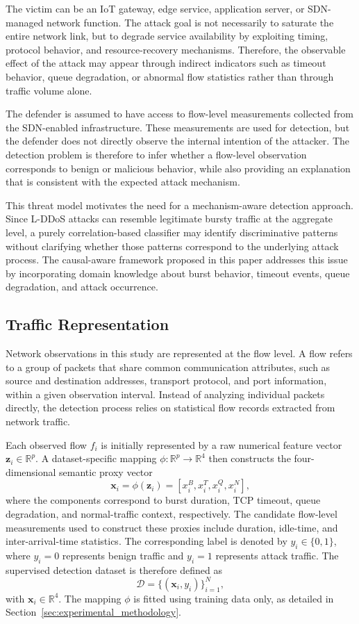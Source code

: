 \documentclass[journal]{IEEEtran}
\begin{document}
The victim can be an IoT gateway, edge service, application server, or SDN-managed network function. The attack goal is not necessarily to saturate the entire network link, but to degrade service availability by exploiting timing, protocol behavior, and resource-recovery mechanisms. Therefore, the observable effect of the attack may appear through indirect indicators such as timeout behavior, queue degradation, or abnormal flow statistics rather than through traffic volume alone.

The defender is assumed to have access to flow-level measurements collected from the SDN-enabled infrastructure. These measurements are used for detection, but the defender does not directly observe the internal intention of the attacker. The detection problem is therefore to infer whether a flow-level observation corresponds to benign or malicious behavior, while also providing an explanation that is consistent with the expected attack mechanism.

This threat model motivates the need for a mechanism-aware detection approach. Since L-DDoS attacks can resemble legitimate bursty traffic at the aggregate level, a purely correlation-based classifier may identify discriminative patterns without clarifying whether those patterns correspond to the underlying attack process. The causal-aware framework proposed in this paper addresses this issue by incorporating domain knowledge about burst behavior, timeout events, queue degradation, and attack occurrence.

\subsection{Traffic Representation}
\label{subsec:traffic_representation}

Network observations in this study are represented at the flow level. A flow refers to a group of packets that share common communication attributes, such as source and destination addresses, transport protocol, and port information, within a given observation interval. Instead of analyzing individual packets directly, the detection process relies on statistical flow records extracted from network traffic.

Each observed flow $f_i$ is initially represented by a raw numerical feature
vector $\mathbf{z}_i \in \mathbb{R}^{p}$. A dataset-specific mapping
$\phi: \mathbb{R}^{p} \rightarrow \mathbb{R}^{4}$ then constructs the
four-dimensional semantic proxy vector
\[
  \mathbf{x}_i = \phi(\mathbf{z}_i)
  = [x_i^{B},x_i^{T},x_i^{Q},x_i^{N}],
\]
where the components correspond to burst duration, TCP timeout, queue
degradation, and normal-traffic context, respectively. The candidate
flow-level measurements used to construct these proxies include duration,
idle-time, and inter-arrival-time statistics. The corresponding label is
denoted by $y_i \in \{0,1\}$, where $y_i = 0$ represents benign traffic and
$y_i = 1$ represents attack traffic. The supervised detection dataset is
therefore defined as
\[
  \mathcal{D} = \{(\mathbf{x}_i, y_i)\}_{i=1}^{N},
\]
with $\mathbf{x}_i \in \mathbb{R}^{4}$. The mapping $\phi$ is fitted using
training data only, as detailed in Section~\ref{sec:experimental_methodology}.
\end{document}
